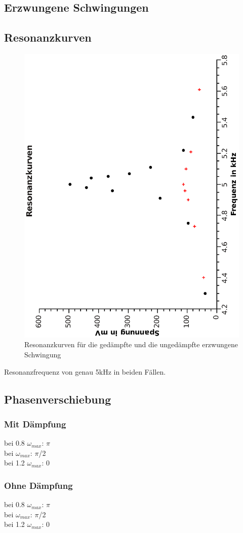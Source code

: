 \documentclass{article}
\begin{document}
\subsection{Erzwungene Schwingungen}


\subsection*{Resonanzkurven}


\begin{center}
\begin{figure}
\includegraphics[width=0.5\linewidth ,angle=-90]{resonanzkurven.eps}
\caption{Resonanzkurven für die gedämpfte und die ungedämpfte erzwungene Schwingung}
\end{figure}
\end{center}

Resonanzfrequenz von genau 5kHz in beiden Fällen.

\subsection*{Phasenverschiebung}
\subsubsection*{Mit Dämpfung}
bei 0.8 $\omega_{max}$: $\pi$\\
bei $\omega_{max}$: $\pi$/2\\
bei 1.2 $\omega_{max}$: 0\\



\subsubsection*{Ohne Dämpfung}
bei 0.8 $\omega_{max}$: $\pi$\\
bei $\omega_{max}$: $\pi$/2\\
bei 1.2 $\omega_{max}$: 0\\
\end{document}
